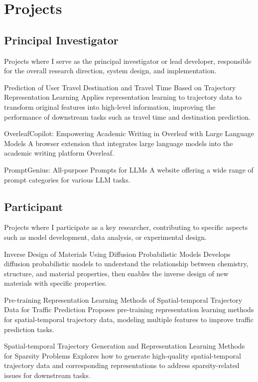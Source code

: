 \label{sec:projects}
\section*{Projects}

\subsection*{Principal Investigator}
Projects where I serve as the principal investigator or lead developer, responsible for the overall research direction, system design, and implementation.

{Prediction of User Travel Destination and Travel Time Based on Trajectory Representation Learning}
{}
{Applies representation learning to trajectory data to transform original features into high-level information, improving the performance of downstream tasks such as travel time and destination prediction.}

{OverleafCopilot: Empowering Academic Writing in Overleaf with Large Language Models}
{}
{A browser extension that integrates large language models into the academic writing platform Overleaf.}

{PromptGenius: All-purpose Prompts for LLMs}
{}
{A website offering a wide range of prompt categories for various LLM tasks.}

\subsection*{Participant}
Projects where I participate as a key researcher, contributing to specific aspects such as model development, data analysis, or experimental design.

{Inverse Design of Materials Using Diffusion Probabilistic Models}
{}
{Develops diffusion probabilistic models to understand the relationship between chemistry, structure, and material properties, then enables the inverse design of new materials with specific properties.}

{Pre-training Representation Learning Methods of Spatial-temporal Trajectory Data for Traffic Prediction}
{}
{Proposes pre-training representation learning methods for spatial-temporal trajectory data, modeling multiple features to improve traffic prediction tasks.}

{Spatial-temporal Trajectory Generation and Representation Learning Methods for Sparsity Problems}
{}
{Explores how to generate high-quality spatial-temporal trajectory data and corresponding representations to address sparsity-related issues for downstream tasks.}
